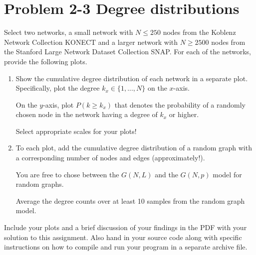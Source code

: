 \section{Problem 2-3 Degree distributions}

Select two networks, a small network with $N \le 250$ nodes from the Koblenz Network Collection KONECT and a larger network with $N \ge 2500$ nodes from the Stanford Large Network Dataset Collection SNAP. For each of the networks, provide the following plots. 

\begin{enumerate}
 \item Show the cumulative degree distribution of each network in a separate plot. Specifically, plot the degree $k_x \in \{1,...,N\}$ on the $x$-axis. 
 
 On the $y$-axis, plot $P(k \ge k_x)$ that denotes the probability of a randomly chosen node in the network having a degree of $k_x$ or higher. 
 
 Select appropriate scales for your plots!
 
 \item To each plot, add the cumulative degree distribution of a random graph with a corresponding number of nodes and edges (approximately!). 
 
 You are free to chose between the $G(N,L)$ and the $G(N,p)$ model for random graphs. 
 
 Average the degree counts over at least 10 samples from the random graph model. 
 

\end{enumerate}

Include your plots and a brief discussion of your findings in the PDF with your solution to this assignment. Also hand in your source code along with specific instructions on how to compile and run your program in a separate archive file.


